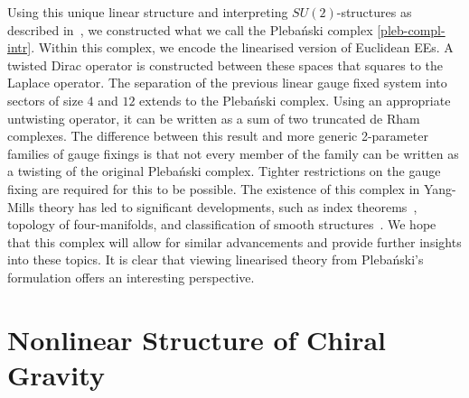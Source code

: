 \documentclass[10pt]{report}
\newcommand{\pleb}[0]{Pleba\'nski}
\theoremstyle{definition}
\begin{document}
    Using this unique linear structure and interpreting $SU(2)$-structures as described in~\cite{Su2StructureBhoja2024}, we constructed what we call the \pleb{} complex \cref{pleb-compl-intr}. Within this complex, we encode the linearised version of Euclidean EEs. A twisted Dirac operator is constructed between these spaces that squares to the Laplace operator. The separation of the previous linear gauge fixed system into sectors of size $4$ and $12$ extends to the \pleb{} complex. Using an appropriate untwisting operator, it can be written as a sum of two truncated de Rham complexes. The difference between this result and more generic 2-parameter families of gauge fixings is that not every member of the family can be written as a twisting of the original \pleb{} complex. Tighter restrictions on the gauge fixing are required for this to be possible. The existence of this complex in Yang-Mills theory has led to significant developments, such as index theorems~\cite{The_Index_of_El_Atiyah_1968}, topology of four-manifolds, and classification of smooth structures~\cite{Donaldson:1983wm}. We hope that this complex will allow for similar advancements and provide further insights into these topics. It is clear that viewing linearised theory from \pleb{}'s formulation offers an interesting perspective.

    \section{Nonlinear Structure of Chiral Gravity}
\end{document}
